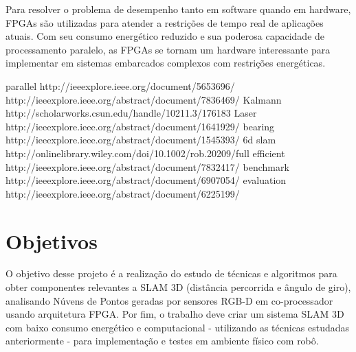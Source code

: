 	Para resolver o problema de desempenho tanto em software quando em hardware, FPGAs são utilizadas para atender a restrições de tempo real \cite{tertei2014fpga} de aplicações atuais. Com seu consumo energético reduzido e sua poderosa capacidade de processamento paralelo, as FPGAs se tornam um hardware interessante para implementar em sistemas embarcados complexos com restrições energéticas.

	
	
	parallel http://ieeexplore.ieee.org/document/5653696/
	http://ieeexplore.ieee.org/abstract/document/7836469/
	Kalmann http://scholarworks.csun.edu/handle/10211.3/176183
	Laser http://ieeexplore.ieee.org/abstract/document/1641929/
	bearing http://ieeexplore.ieee.org/abstract/document/1545393/
	6d slam http://onlinelibrary.wiley.com/doi/10.1002/rob.20209/full
	efficient http://ieeexplore.ieee.org/abstract/document/7832417/
	benchmark http://ieeexplore.ieee.org/abstract/document/6907054/
	evaluation http://ieeexplore.ieee.org/abstract/document/6225199/	
	
	\chapter*[Objetivos]{Objetivos}
	
	O objetivo desse projeto é a realização do estudo de técnicas e algoritmos para obter componentes relevantes a SLAM 3D (distância percorrida e ângulo de giro), analisando Núvens de Pontos geradas por sensores RGB-D em co-processador usando arquitetura FPGA. Por fim, o trabalho deve criar um sistema SLAM 3D com baixo consumo energético e computacional - utilizando as técnicas estudadas anteriormente - para implementação e testes em ambiente físico com robô.

	\begin{comment}
	\section*{Motivação}\label{sec-motivacao}
		
	Motivacao
	\cite{Rusu_ICRA2011_PCL}
	\end{comment}